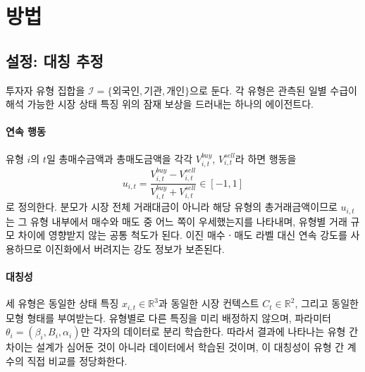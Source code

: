 %
%
%
%

\section{방법}
\label{sec:method}

\subsection{설정: 대칭 추정}
\label{sec:setup}

투자자 유형 집합을 $\mathcal{I}=\{\text{외국인},\text{기관},\text{개인}\}$으로
둔다. 각 유형은 관측된 일별 수급이 해석 가능한 시장 상태 특징 위의 잠재 보상을
드러내는 하나의 에이전트다.

\paragraph{연속 행동}
유형 $i$의 $t$일 총매수금액과 총매도금액을 각각 $V^{buy}_{i,t}$,
$V^{sell}_{i,t}$라 하면 행동을
\begin{equation}
u_{i,t}=\frac{V^{buy}_{i,t}-V^{sell}_{i,t}}
             {V^{buy}_{i,t}+V^{sell}_{i,t}}\in[-1,1]
\label{eq:action}
\end{equation}
로 정의한다. 분모가 시장 전체 거래대금이 아니라 해당 유형의 총거래금액이므로
$u_{i,t}$는 그 유형 내부에서 매수와 매도 중 어느 쪽이 우세했는지를 나타내며,
유형별 거래 규모 차이에 영향받지 않는 공통 척도가 된다. 이진 매수ㆍ매도 라벨
대신 연속 강도를 사용하므로 이진화에서 버려지는 강도 정보가 보존된다.

\paragraph{대칭성}
세 유형은 동일한 상태 특징 $x_{i,t}\in\mathbb{R}^{3}$과 동일한 시장 컨텍스트
$C_t\in\mathbb{R}^{2}$, 그리고 동일한 모형 형태를 부여받는다. 유형별로 다른
특징을 미리 배정하지 않으며, 파라미터 $\theta_i=(\beta_i,B_i,\alpha_i)$만 각자의
데이터로 분리 학습한다. 따라서 결과에 나타나는 유형 간 차이는 설계가 심어둔 것이
아니라 데이터에서 학습된 것이며, 이 대칭성이 유형 간 계수의 직접 비교를
정당화한다.

